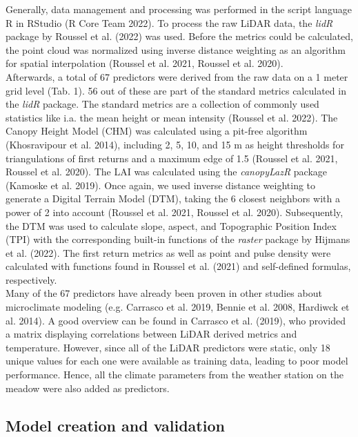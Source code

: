 \documentclass[5p]{elsarticle} %
\begin{document}
Generally, data management and processing was performed in the script language R in RStudio (R Core Team 2022). To process the raw LiDAR data, the \emph{lidR} package by Roussel et al. (2022) was used. Before the metrics could be calculated, the point cloud was normalized using inverse distance weighting as an algorithm for spatial interpolation (Roussel et al. 2021, Roussel et al. 2020).\\  
Afterwards, a total of 67 predictors were derived from the raw data on a 1 meter grid level (Tab. 1). 56 out of these are part of the standard metrics calculated in the \emph{lidR} package. The standard metrics are a collection of commonly used statistics like i.a. the mean height or mean intensity (Roussel et al. 2022). The Canopy Height Model (CHM) was calculated using a pit-free algorithm (Khosravipour et al. 2014), including 2, 5, 10, and 15 m as height thresholds for triangulations of first returns and a maximum edge of 1.5 (Roussel et al. 2021, Roussel et al. 2020). The LAI was calculated using the \emph{canopyLazR} package (Kamoske et al. 2019). Once again, we used inverse distance weighting to generate a Digital Terrain Model (DTM), taking the 6 closest neighbors with a power of 2 into account (Roussel et al. 2021, Roussel et al. 2020). Subsequently, the DTM was used to calculate slope, aspect, and Topographic Position Index (TPI) with the corresponding built-in functions of the \emph{raster} package by Hijmans et al. (2022). The first return metrics as well as point and pulse density were calculated with functions found in Roussel et al. (2021) and self-defined formulas, respectively.\\ 
Many of the 67 predictors have already been proven in other studies about microclimate modeling (e.g. Carrasco et al. 2019, Bennie et al. 2008, Hardiwck et al. 2014). A good overview can be found in Carrasco et al. (2019), who provided a matrix displaying correlations between LiDAR derived metrics and temperature. However, since all of the LiDAR predictors were static, only 18 unique values for each one were available as training data, leading to poor model performance. Hence, all the climate parameters from the weather station on the meadow were also added as predictors.


\hypertarget{model creation and validation}{%
\subsection{\texorpdfstring{Model creation and validation\\
}{Model creation and validation }}\label{model-creation-and-validation}}
\end{document}

